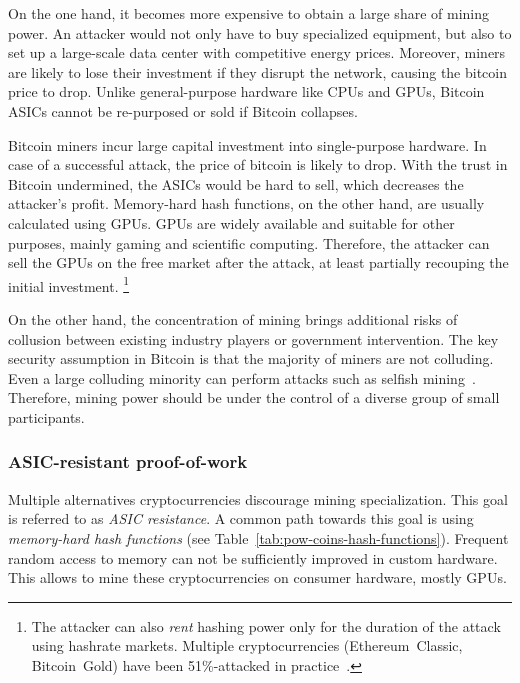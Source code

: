 On the one hand, it becomes more expensive to obtain a large share of mining power.
An attacker would not only have to buy specialized equipment, but also to set up a large-scale data center with competitive energy prices.
Moreover, miners are likely to lose their investment if they disrupt the network, causing the bitcoin price to drop.
Unlike general-purpose hardware like CPUs and GPUs, Bitcoin ASICs cannot be re-purposed or sold if Bitcoin collapses.

Bitcoin miners incur large capital investment into single-purpose hardware.
In case of a successful attack, the price of bitcoin is likely to drop.
With the trust in Bitcoin undermined, the ASICs would be hard to sell, which decreases the attacker's profit.
Memory-hard hash functions, on the other hand, are usually calculated using GPUs.
GPUs are widely available and suitable for other purposes, mainly gaming and scientific computing.
Therefore, the attacker can sell the GPUs on the free market after the attack, at least partially recouping the initial investment.
 \footnote{The attacker can also \textit{rent} hashing power only for the duration of the attack using hashrate markets. Multiple cryptocurrencies (Ethereum~Classic, Bitcoin~Gold) have been 51\%-attacked in practice~\cite{Xazax3102019}.}

On the other hand, the concentration of mining brings additional risks of collusion between existing industry players or government intervention.
The key security assumption in Bitcoin is that the majority of miners are not colluding.
Even a large colluding minority can perform attacks such as selfish mining~\cite{Eyal2018}.
Therefore, mining power should be under the control of a diverse group of small participants.


\subsubsection*{ASIC-resistant proof-of-work}

Multiple alternatives cryptocurrencies discourage mining specialization.
This goal is referred to as \textit{ASIC resistance}.
A common path towards this goal is using \textit{memory-hard hash functions} (see Table~\ref{tab:pow-coins-hash-functions}).
Frequent random access to memory can not be sufficiently improved in custom hardware.
This allows to mine these cryptocurrencies on consumer hardware, mostly GPUs.

